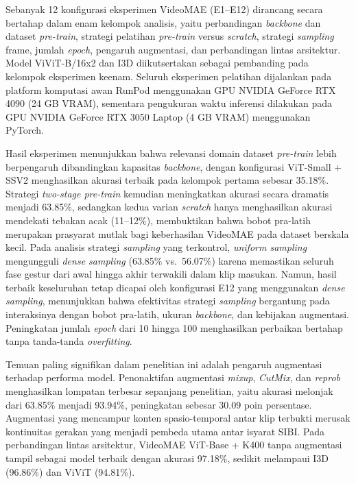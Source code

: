 \begin{center}
	Sebanyak 12 konfigurasi eksperimen VideoMAE (E1--E12) dirancang secara bertahap dalam enam kelompok analisis, yaitu perbandingan \textit{backbone} dan dataset \textit{pre-train}, strategi pelatihan \textit{pre-train} versus \textit{scratch}, strategi \textit{sampling} frame, jumlah \textit{epoch}, pengaruh augmentasi, dan perbandingan lintas arsitektur. Model ViViT-B/16x2 dan I3D diikutsertakan sebagai pembanding pada kelompok eksperimen keenam. Seluruh eksperimen pelatihan dijalankan pada platform komputasi awan RunPod menggunakan GPU NVIDIA GeForce RTX 4090 (24 GB VRAM), sementara pengukuran waktu inferensi dilakukan pada GPU NVIDIA GeForce RTX 3050 Laptop (4 GB VRAM) menggunakan PyTorch.

	Hasil eksperimen menunjukkan bahwa relevansi domain dataset \textit{pre-train} lebih berpengaruh dibandingkan kapasitas \textit{backbone}, dengan konfigurasi ViT-Small + SSV2 menghasilkan akurasi terbaik pada kelompok pertama sebesar 35.18\%. Strategi \textit{two-stage pre-train} kemudian meningkatkan akurasi secara dramatis menjadi 63.85\%, sedangkan kedua varian \textit{scratch} hanya menghasilkan akurasi mendekati tebakan acak (11--12\%), membuktikan bahwa bobot pra-latih merupakan prasyarat mutlak bagi keberhasilan VideoMAE pada dataset berskala kecil. Pada analisis strategi \textit{sampling} yang terkontrol, \textit{uniform sampling} mengungguli \textit{dense sampling} (63.85\% vs.\ 56.07\%) karena memastikan seluruh fase gestur dari awal hingga akhir terwakili dalam klip masukan. Namun, hasil terbaik keseluruhan tetap dicapai oleh konfigurasi E12 yang menggunakan \textit{dense sampling}, menunjukkan bahwa efektivitas strategi \textit{sampling} bergantung pada interaksinya dengan bobot pra-latih, ukuran \textit{backbone}, dan kebijakan augmentasi. Peningkatan jumlah \textit{epoch} dari 10 hingga 100 menghasilkan perbaikan bertahap tanpa tanda-tanda \textit{overfitting}.

	Temuan paling signifikan dalam penelitian ini adalah pengaruh augmentasi terhadap performa model. Penonaktifan augmentasi \textit{mixup}, \textit{CutMix}, dan \textit{reprob} menghasilkan lompatan terbesar sepanjang penelitian, yaitu akurasi melonjak dari 63.85\% menjadi 93.94\%, peningkatan sebesar 30.09 poin persentase. Augmentasi yang mencampur konten spasio-temporal antar klip terbukti merusak kontinuitas gerakan yang menjadi pembeda utama antar isyarat SIBI. Pada perbandingan lintas arsitektur, VideoMAE ViT-Base + K400 tanpa augmentasi tampil sebagai model terbaik dengan akurasi 97.18\%, sedikit melampaui I3D (96.86\%) dan ViViT (94.81\%).


\end{center}
